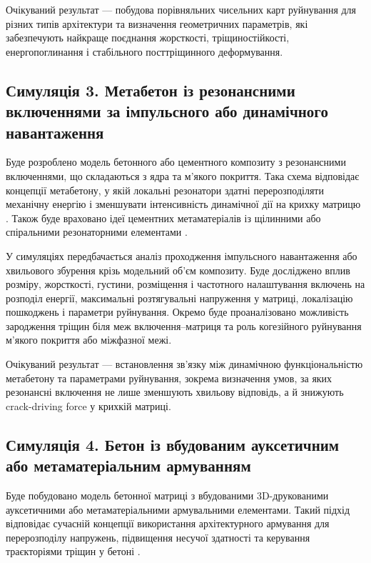 \documentclass[12pt,a4paper]{article}
\begin{document}
Очікуваний результат --- побудова порівняльних чисельних карт руйнування для різних типів архітектури та визначення геометричних параметрів, які забезпечують найкраще поєднання жорсткості, тріщиностійкості, енергопоглинання і стабільного посттріщинного деформування.

\subsection*{Симуляція 3. Метабетон із резонансними включеннями за імпульсного або динамічного навантаження}

Буде розроблено модель бетонного або цементного композиту з резонансними включеннями, що складаються з ядра та м'якого покриття. Така схема відповідає концепції метабетону, у якій локальні резонатори здатні перерозподіляти механічну енергію і зменшувати інтенсивність динамічної дії на крихку матрицю \cite{Mitchell2014}. Також буде враховано ідеї цементних метаматеріалів із щілинними або спіральними резонаторними елементами \cite{Imagawa2025}.

У симуляціях передбачається аналіз проходження імпульсного навантаження або хвильового збурення крізь модельний об'єм композиту. Буде досліджено вплив розміру, жорсткості, густини, розміщення і частотного налаштування включень на розподіл енергії, максимальні розтягувальні напруження у матриці, локалізацію пошкоджень і параметри руйнування. Окремо буде проаналізовано можливість зародження тріщин біля меж включення--матриця та роль когезійного руйнування м'якого покриття або міжфазної межі.

Очікуваний результат --- встановлення зв'язку між динамічною функціональністю метабетону та параметрами руйнування, зокрема визначення умов, за яких резонансні включення не лише зменшують хвильову відповідь, а й знижують crack-driving force у крихкій матриці.

\subsection*{Симуляція 4. Бетон із вбудованим ауксетичним або метаматеріальним армуванням}

Буде побудовано модель бетонної матриці з вбудованими 3D-друкованими ауксетичними або метаматеріальними армувальними елементами. Такий підхід відповідає сучасній концепції використання архітектурного армування для перерозподілу напружень, підвищення несучої здатності та керування траєкторіями тріщин у бетоні \cite{Vandadi2025}.
\end{document}
